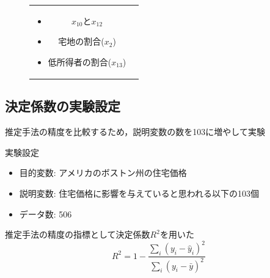 \documentclass[dvipdfmx, 10pt]{beamer}
\begin{document}
\begin{frame}{\insertsubsection}
\begin{figure}[H]
\begin{tabular}{cc}
\begin{minipage}{0.5\hsize}
\begin{itemize}
\begin{itemize}
                                      \begin{itemize}
                                            \item $x_{10}$と$x_{12}$
                                            \item 宅地の割合($x_2$)
                                            \item 低所得者の割合($x_{13}$)
                                       \end{itemize}
                                   \end{itemize}
                            \end{itemize}
            	\end{minipage}
    	     \end{tabular}
    \end{figure}
    \end{frame}

\subsection{決定係数の実験設定}
\begin{frame}{\insertsubsection}
    推定手法の精度を比較するため，説明変数の数を103に増やして実験
    \begin{block}{実験設定}
        \begin{itemize}
                \item 目的変数: アメリカのボストン州の住宅価格
                \item 説明変数: 住宅価格に影響を与えていると思われる以下の103個
                \item データ数: 506
        \end{itemize}
    \end{block}
    推定手法の精度の指標として決定係数$R^2$を用いた
    \begin{equation}
    	R^2 = 1 - \frac{\sum_{i}^{}(y_i - \hat{y}_i)^2}{\sum_{i}^{}(y_i - \bar{y})^2}
    \end{equation}
\end{frame}
\end{document}
